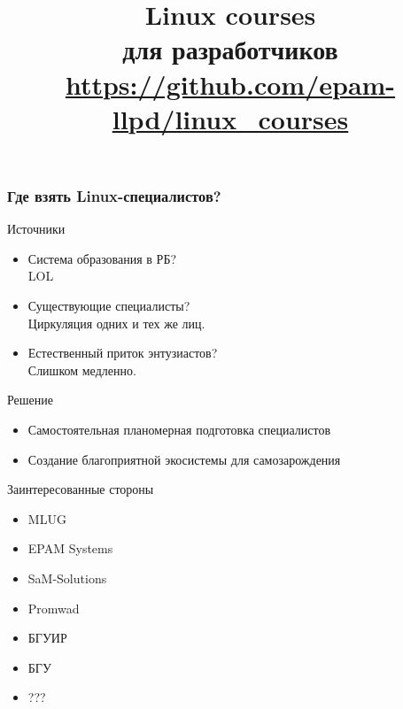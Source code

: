 
\graphicspath{{../lvee2013-winter/clipart/}{../altlinux-2014/}}


\title{Linux courses\\для разработчиков\\\href{https://github.com/epam-llpd/linux\_courses}{https://github.com/epam-llpd/linux\_courses}}




\begin{frame}
	\frametitle{}
	\titlepage
	\vspace{-0.5cm}
	\begin{center}
	\end{center}
\end{frame}

\begin{frame}
	\frametitle{Где взять Linux-специалистов?}

	\begin{block}{Источники}
		\begin{itemize}
			\item Система образования в РБ? \\
				LOL
			\item Существующие специалисты? \\
				Циркуляция одних и тех же лиц.
			\item Естественный приток энтузиастов? \\
				Слишком медленно.
		\end{itemize}
	\end{block}

	\begin{block}{Решение}
		\begin{itemize}
			\item Самостоятельная планомерная подготовка специалистов
			\item Создание благоприятной экосистемы для самозарождения
		\end{itemize}
	\end{block}
\end{frame}


\begin{frame}[fragile]{Заинтересованные стороны}

	  \begin{itemize}
		\item MLUG
		\item EPAM Systems
		\item SaM-Solutions
		\item Promwad
		\item БГУИР
		\item БГУ
                \item ???
	  \end{itemize}
\end{frame}

